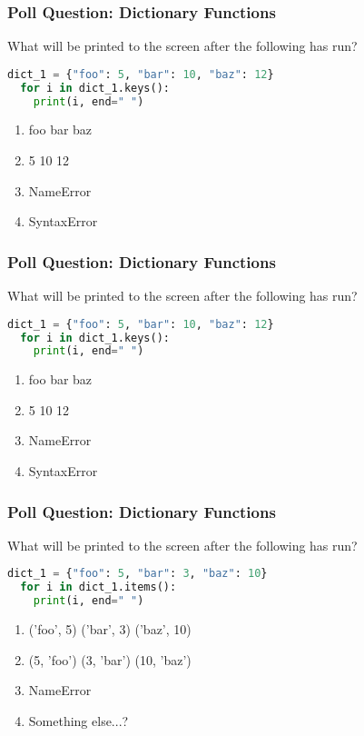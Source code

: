 \documentclass{beamer}
\begin{document}
%
%
\begin{frame}[fragile]
  \frametitle{Poll Question: Dictionary Functions}
  What will be printed to the screen after the following has run?
  \begin{lstlisting}[language=Python, autogobble]
  dict_1 = {"foo": 5, "bar": 10, "baz": 12}
  for i in dict_1.keys():
    print(i, end=" ")
  \end{lstlisting}
  \vfill
  \begin{enumerate}[A]
    \item foo bar baz
    \item 5 10 12 
    \item NameError
    \item SyntaxError
  \end{enumerate}
\end{frame}

%
%
\begin{frame}[fragile]
  \frametitle{Poll Question: Dictionary Functions}
  What will be printed to the screen after the following has run?
  \begin{lstlisting}[language=Python, autogobble]
  dict_1 = {"foo": 5, "bar": 10, "baz": 12}
  for i in dict_1.keys():
    print(i, end=" ")
  \end{lstlisting}
  \vfill
  \begin{enumerate}[A]
    \item foo bar baz
    \item 5 10 12 
    \item NameError
    \item SyntaxError
  \end{enumerate}
\end{frame}

%
%
\begin{frame}[fragile]
  \frametitle{Poll Question: Dictionary Functions}
  What will be printed to the screen after the following has run?
  \begin{lstlisting}[language=Python, autogobble]
  dict_1 = {"foo": 5, "bar": 3, "baz": 10}
  for i in dict_1.items():
    print(i, end=" ")
  \end{lstlisting}
  \vfill
  \begin{enumerate}[A]
    \item ('foo', 5) ('bar', 3) ('baz', 10)
    \item (5, 'foo') (3, 'bar') (10, 'baz')
    \item NameError
    \item Something else...?
  \end{enumerate}
\end{frame}
\end{document}
